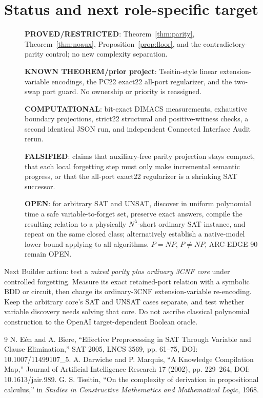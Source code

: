 \documentclass[11pt]{article}
\begin{document}
\section{Status and next role-specific target}
\begin{description}
\item[] \textbf{PROVED/RESTRICTED}: Theorem~\ref{thm:parity}, Theorem~\ref{thm:noaux}, Proposition~\ref{prop:floor}, and the contradictory-parity control; no new complexity separation.
\item[] \textbf{KNOWN THEOREM/prior project}: Tseitin-style linear extension-variable encodings, the PC22 exact22 all-port regularizer, and the two-swap port guard. No ownership or priority is reassigned.
\item[] \textbf{COMPUTATIONAL}: bit-exact DIMACS measurements, exhaustive boundary projections, strict22 structural and positive-witness checks, a second identical JSON run, and independent Connected Interface Audit rerun.
\item[] \textbf{FALSIFIED}: claims that auxiliary-free parity projection stays compact, that each local forgetting step must only make incremental semantic progress, or that the all-port exact22 regularizer is a shrinking SAT successor.
\item[] \textbf{OPEN}: for arbitrary SAT and UNSAT, discover in uniform polynomial time a safe variable-to-forget set, preserve exact answers, compile the resulting relation to a physically $N^\lambda$-short ordinary SAT instance, and repeat on the same closed class; alternatively establish a native-model lower bound applying to all algorithms. $P=NP$, $P\ne NP$, ARC-EDGE-90 remain OPEN.
\end{description}
Next Builder action: test a \emph{mixed parity plus ordinary 3CNF core} under controlled forgetting. Measure its exact retained-port relation with a symbolic BDD or circuit, then charge its ordinary-3CNF extension-variable re-encoding. Keep the arbitrary core's SAT and UNSAT cases separate, and test whether variable discovery needs solving that core. Do not ascribe classical polynomial construction to the OpenAI target-dependent Boolean oracle.

\begin{thebibliography}{9}
 N. E\'en and A. Biere, ``Effective Preprocessing in SAT Through Variable and Clause Elimination,'' SAT 2005, LNCS 3569, pp. 61--75, DOI: 10.1007/11499107\_5.
 A. Darwiche and P. Marquis, ``A Knowledge Compilation Map,'' Journal of Artificial Intelligence Research 17 (2002), pp. 229--264, DOI: 10.1613/jair.989.
 G. S. Tseitin, ``On the complexity of derivation in propositional calculus,'' in \emph{Studies in Constructive Mathematics and Mathematical Logic}, 1968.
\end{thebibliography}
\end{document}
